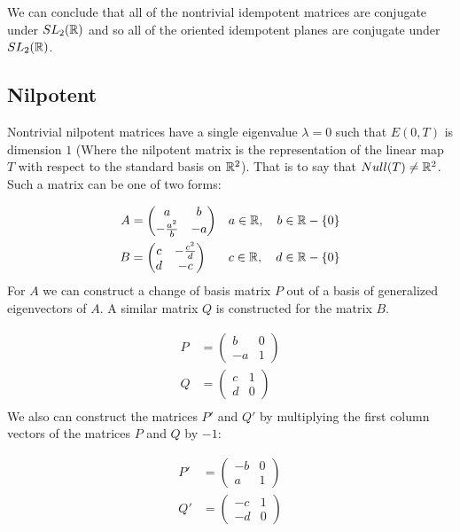 \documentclass{article}
\begin{document}
We can conclude that all of the nontrivial idempotent matrices are conjugate under $SL_2(\protect\mathbb{R})$ and so all of the oriented idempotent planes are conjugate under $SL_2(\protect\mathbb{R})$.

\subsection{Nilpotent}

Nontrivial nilpotent matrices have a single eigenvalue $\lambda = 0$ such that $E(0,T)$ is dimension $1$ (Where the nilpotent matrix is the representation of the linear map $T$ with respect to the standard basis on $\protect\mathbb{R}^2$). That is to say that $Null(T)\neq\protect\mathbb{R}^2$. Such a matrix can be one of two forms:

\begin{align*}
A &= \left(\begin{matrix}
    a & b \\
    -\frac{a^2}{b} & -a 
\end{matrix}\right) & a \in \protect\mathbb{R}, \quad b \in \protect\mathbb{R}-\{0\} \\
B &= \left(\begin{matrix}
    c & -\frac{c^2}{d}\\
    d & -c 
\end{matrix}\right) & c \in \protect\mathbb{R}, \quad d \in \protect\mathbb{R}-\{0\} \\
\end{align*}
For $A$ we can construct a change of basis matrix $P$ out of a basis of generalized eigenvectors of $A$. A similar matrix $Q$ is constructed for the matrix $B$.

\begin{align*}
P &= \left(\begin{matrix}
    b & 0 \\
    -a & 1 
\end{matrix}\right) \\
Q &= \left(\begin{matrix}
    c & 1\\
    d & 0 
\end{matrix}\right) \\
\end{align*}
We also can construct the matrices $P'$ and $Q'$ by multiplying the first column vectors of the matrices $P$ and $Q$ by $-1$:

\begin{align*}
P' &= \left(\begin{matrix}
    -b & 0 \\
    a & 1 
\end{matrix}\right) \\
Q' &= \left(\begin{matrix}
    -c & 1\\
    -d & 0 
\end{matrix}\right) \\
\end{align*}
\end{document}
